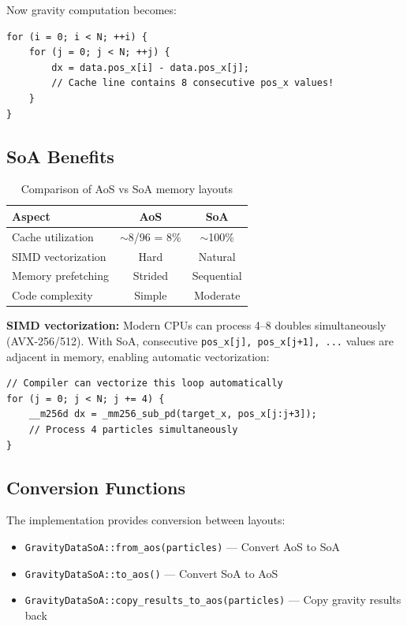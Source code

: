 \documentclass[12pt]{article}
\begin{document}
Now gravity computation becomes:
\begin{verbatim}
for (i = 0; i < N; ++i) {
    for (j = 0; j < N; ++j) {
        dx = data.pos_x[i] - data.pos_x[j];
        // Cache line contains 8 consecutive pos_x values!
    }
}
\end{verbatim}

\subsection{SoA Benefits}

\begin{table}[h]
\centering
\begin{tabular}{lcc}
\toprule
\textbf{Aspect} & \textbf{AoS} & \textbf{SoA} \\
\midrule
Cache utilization & $\sim$8/96 = 8\% & $\sim$100\% \\
SIMD vectorization & Hard & Natural \\
Memory prefetching & Strided & Sequential \\
Code complexity & Simple & Moderate \\
\bottomrule
\end{tabular}
\caption{Comparison of AoS vs SoA memory layouts}
\end{table}

\textbf{SIMD vectorization:} Modern CPUs can process 4--8 doubles simultaneously (AVX-256/512).
With SoA, consecutive \texttt{pos\_x[j], pos\_x[j+1], ...} values are adjacent in memory,
enabling automatic vectorization:

\begin{verbatim}
// Compiler can vectorize this loop automatically
for (j = 0; j < N; j += 4) {
    __m256d dx = _mm256_sub_pd(target_x, pos_x[j:j+3]);
    // Process 4 particles simultaneously
}
\end{verbatim}

\subsection{Conversion Functions}

The implementation provides conversion between layouts:
\begin{itemize}
\item \texttt{GravityDataSoA::from\_aos(particles)} --- Convert AoS to SoA
\item \texttt{GravityDataSoA::to\_aos()} --- Convert SoA to AoS
\item \texttt{GravityDataSoA::copy\_results\_to\_aos(particles)} --- Copy gravity results back
\end{itemize}
\end{document}
